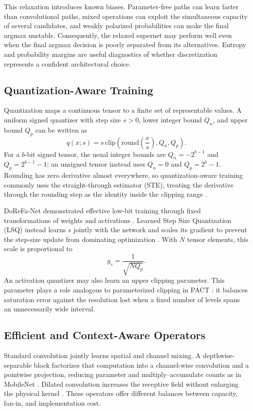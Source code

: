 \documentclass[lettersize,journal]{IEEEtran}
\begin{document}
This relaxation introduces known biases. Parameter-free paths can learn faster than convolutional paths, mixed operations can exploit the simultaneous capacity of several candidates, and weakly polarized probabilities can make the final argmax unstable. Consequently, the relaxed supernet may perform well even when the final argmax decision is poorly separated from its alternatives. Entropy and probability margins are useful diagnostics of whether discretization represents a confident architectural choice.

\subsection{Quantization-Aware Training}
Quantization maps a continuous tensor to a finite set of representable values. A uniform signed quantizer with step size $s>0$, lower integer bound $Q_n$, and upper bound $Q_p$ can be written as
\begin{equation}
q(x;s)=s\,\mathrm{clip}\!\left(\mathrm{round}\!\left(\frac{x}{s}\right),Q_n,Q_p\right).
\label{eq:quantizer}
\end{equation}
For a $b$-bit signed tensor, the usual integer bounds are $Q_n=-2^{b-1}$ and $Q_p=2^{b-1}-1$; an unsigned tensor instead uses $Q_n=0$ and $Q_p=2^b-1$. Rounding has zero derivative almost everywhere, so quantization-aware training commonly uses the straight-through estimator (STE), treating the derivative through the rounding step as the identity inside the clipping range \cite{bengio2013ste,yin2019ste}.

DoReFa-Net demonstrated effective low-bit training through fixed transformations of weights and activations \cite{zhou2018dorefa}. Learned Step Size Quantization (LSQ) instead learns $s$ jointly with the network and scales its gradient to prevent the step-size update from dominating optimization \cite{esser2020lsq}. With $N$ tensor elements, this scale is proportional to
\begin{equation}
g_s=\frac{1}{\sqrt{NQ_p}}.
\label{eq:lsqgrad}
\end{equation}
An activation quantizer may also learn an upper clipping parameter. This parameter plays a role analogous to parameterized clipping in PACT \cite{choi2018pact}: it balances saturation error against the resolution lost when a fixed number of levels spans an unnecessarily wide interval.

\subsection{Efficient and Context-Aware Operators}
Standard convolution jointly learns spatial and channel mixing. A depthwise-separable block factorizes that computation into a channel-wise convolution and a pointwise projection, reducing parameter and multiply--accumulate counts as in MobileNet \cite{howard2017mobilenets}. Dilated convolution increases the receptive field without enlarging the physical kernel \cite{yu2016dilated}. These operators offer different balances between capacity, fan-in, and implementation cost.
\end{document}
